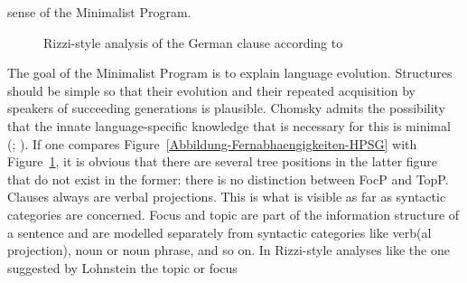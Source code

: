 sense of the Minimalist Program.
\begin{figure}
\caption{\label{abb-satz-lohnstein}Rizzi-style analysis of the German clause according to \citet[]{Lohnstein2007a}}
\end{figure}
The goal of the Minimalist Program \citep{Chomsky95a-u} is to explain language evolution. Structures
should be simple so that their evolution and their repeated acquisition by speakers of succeeding
generations is plausible. Chomsky admits the possibility that the innate language-specific knowledge
that is necessary for this is minimal (\citealt*{HCF2002a}; \citealt[]{Chomsky2007a}).
If one compares Figure~\ref{Abbildung-Fernabhaengigkeiten-HPSG} with
Figure~\ref{abb-satz-lohnstein}, it is obvious that there are several tree positions in the latter
figure that do not exist in the former: there is no distinction between FocP and TopP. Clauses
always are verbal projections. This is what is visible as far as syntactic categories are
concerned. Focus and topic are part of the information structure of a sentence and are modelled
separately from syntactic categories like verb(al projection), noun or noun phrase, and so on.
In Rizzi-style\nocite{Rizzi97a-u} analyses like the one suggested by Lohnstein the topic or focus
